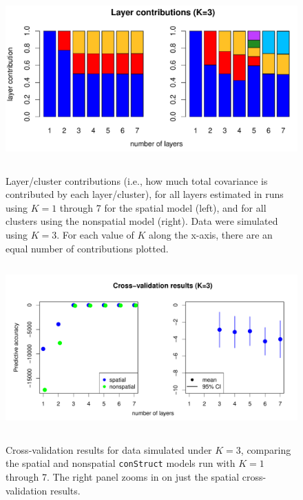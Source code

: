 \documentclass[12pt]{article}
\begin{document}
\begin{figure}
	\centering
		{\includegraphics[width=5in,height=2.5in]{figs/sims/simK3_laycon_barplots.pdf}}
		\caption{
			Layer/cluster contributions (i.e., how much total covariance is contributed by each layer/cluster), 
			for all layers estimated in runs using $K = 1$ through 7 
			for the spatial model (left), 
			and for all clusters using the nonspatial model (right).
			Data were simulated using $K=3$.
			For each value of $K$ along the x-axis, there are an equal number of contributions plotted.
		}\label{simK3_laycon}
\end{figure}

\begin{figure}
	\centering
		{\includegraphics[width=5in,height=2.5in]{figs/sims/simK3_std_xval.pdf}}
		\caption{
			Cross-validation results for data simulated under $K=3$,
			comparing the spatial and nonspatial \texttt{conStruct} models run with $K=1$ through 7.  
			The right panel zooms in on just the spatial cross-validation results.
		}\label{simK3_xval}
\end{figure}
\end{document}
